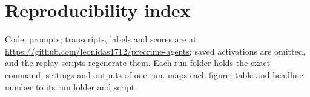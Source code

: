 \section{Reproducibility index}
\label{app:repro}

Code, prompts, transcripts, labels and scores are at \url{https://github.com/leonidas1712/precrime-agents}; saved activations are omitted, and the replay scripts regenerate them.
Each run folder holds the exact command, settings and outputs of one run.
 maps each figure, table and headline number to its run folder and script.

\begin{table}[h]
  \centering
  \small
  
  \caption{Reproducibility index.}
  \label{tab:repro}
\end{table}
